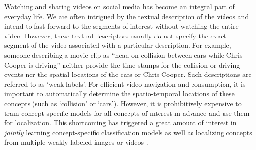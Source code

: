 \documentclass[runningheads]{llncs}
\begin{document}
Watching and sharing videos on social media has become an integral part of everyday life. We are often intrigued by the textual description of the videos and intend to fast-forward to the segments of interest without watching the entire video. However, these textual descriptors usually do not specify the exact segment of the video associated with a particular description. For example, someone describing a movie clip as ``head-on collision between cars while Chris Cooper is driving'' neither provide the time-stamps for the collision or driving events nor the spatial locations of the cars or Chris Cooper. Such descriptions are referred to as `weak labels'. For efficient video navigation and consumption, it is important to automatically determine the spatio-temporal locations of these concepts (such as `collision' or `cars'). However, it is prohibitively expensive to train concept-specific models for all concepts of interest in advance and use them for localization. 
This shortcoming has triggered a great amount of interest in \textit{jointly} learning concept-specific classification models as well as localizing concepts from multiple weakly labeled images \cite{shi2014weakly,leung2011handling,Oquab15} or videos \cite{bojanowski2014weakly,bojanowski2013finding}.

\end{document}
